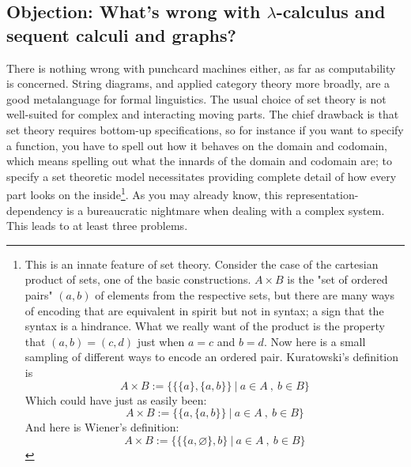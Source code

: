 \subsection{\textbf{Objection:} What's wrong with $\lambda$-calculus and sequent calculi and graphs?}

There is nothing wrong with punchcard machines either, as far as computability is concerned. String diagrams, and applied category theory more broadly, are a good metalanguage for formal linguistics. The usual choice of set theory is not well-suited for complex and interacting moving parts. The chief drawback is that set theory requires bottom-up specifications, so for instance if you want to specify a function, you have to spell out how it behaves on the domain and codomain, which means spelling out what the innards of the domain and codomain are; to specify a set theoretic model necessitates providing complete detail of how every part looks on the inside\footnote{This is an innate feature of set theory. Consider the case of the cartesian product of sets, one of the basic constructions. $A \times B$ is the "set of ordered pairs" $(a,b)$ of elements from the respective sets, but there are many ways of encoding that are equivalent in spirit but not in syntax; a sign that the syntax is a hindrance. What we really want of the product is the property that $(a,b) = (c,d)$ just when $a = c$ and $b = d$. Now here is a small sampling of different ways to encode an ordered pair. Kuratowski's definition is
\[A \times B := \bigg\{ \{\{a\},\{a,b\}\} \ | \ a \in A \ , \ b \in B \bigg\}\]
Which could have just as easily been:
\[A \times B := \bigg\{ \{a,\{a,b\}\} \ | \ a \in A \ , \ b \in B \bigg\}\]
And here is Wiener's definition:
\[A \times B := \bigg\{ \{\{a,\varnothing\},b\} \ | \ a \in A \ , \ b \in B \bigg\}\]}. As you may already know, this representation-dependency is a bureaucratic nightmare when dealing with a complex system. This leads to at least three problems.
